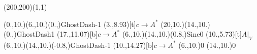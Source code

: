 \unitlength=1bp%

\begin{feynartspicture}(200,200)(1,1)

\FADiagram{}
\FAProp(0.,10.)(6.,10.)(0.,){GhostDash}{-1}
\FALabel(3.,8.93)[t]{$c\to A^*$}
\FAProp(20,10.)(14.,10.)(0.,){GhostDash}{1}
\FALabel(17.,11.07)[b]{$c\to A^*$}
\FAProp(6.,10.)(14.,10.)(0.8,){Sine}{0}
\FALabel(10.,5.73)[t]{$A|_V$}
\FAProp(6.,10.)(14.,10.)(-0.8,){GhostDash}{-1}
\FALabel(10.,14.27)[b]{$c\to A^*$}
\FAVert(6.,10.){0}
\FAVert(14.,10.){0}
\end{feynartspicture}

